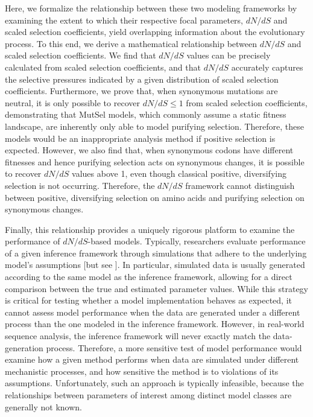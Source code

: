 \documentclass[11pt]{article}
\begin{document}
Here, we formalize the relationship between these two modeling frameworks by examining the extent to which their respective focal parameters, $dN/dS$ and scaled selection coefficients, yield overlapping information about the evolutionary process. To this end, we derive a mathematical relationship between $dN/dS$ and scaled selection coefficients. We find that $dN/dS$ values can be precisely calculated from scaled selection coefficients, and that $dN/dS$ accurately captures the selective pressures indicated by a given distribution of scaled selection coefficients. Furthermore, we prove that, when synonymous mutations are neutral, it is only possible to recover $dN/dS \leq 1$ from scaled selection coefficients, demonstrating that MutSel models, which commonly assume a static fitness landscape, are inherently only able to model purifying selection. Therefore, these models would be an inappropriate analysis method if positive selection is expected. However, we also find that, when synonymous codons have different fitnesses and hence purifying selection acts on synonymous changes, it is possible to recover $dN/dS$ values above 1, even though classical positive, diversifying selection is not occurring. Therefore, the $dN/dS$ framework cannot distinguish between positive, diversifying selection on amino acids and purifying selection on synonymous changes.

Finally, this relationship provides a uniquely rigorous platform to examine the performance of $dN/dS$-based models. Typically, researchers evaluate performance of a given inference framework through simulations that adhere to the underlying model's assumptions [but see \citet{Schoniger1995, Mininetal2003, Holder2008, Yap2010, Rubinsteinetal2011}]. In particular, simulated data is usually generated according to the same model as the inference framework, allowing for a direct comparison between the true and estimated parameter values. While this strategy is critical for testing whether a model implementation behaves as expected, it cannot assess model performance when the data are generated under a different process than the one modeled in the inference framework. However, in real-world sequence analysis, the inference framework will never exactly match the data-generation process. Therefore, a more sensitive test of model performance would examine how a given method performs when data are simulated under different mechanistic processes, and how sensitive the method is to violations of its assumptions. Unfortunately, such an approach is typically infeasible, because the relationships between parameters of interest among distinct model classes are generally not known.
\end{document}
